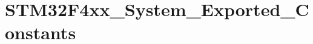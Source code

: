 \hypertarget{group___s_t_m32_f4xx___system___exported___constants}{}\section{S\+T\+M32\+F4xx\+\_\+\+System\+\_\+\+Exported\+\_\+\+Constants}
\label{group___s_t_m32_f4xx___system___exported___constants}
